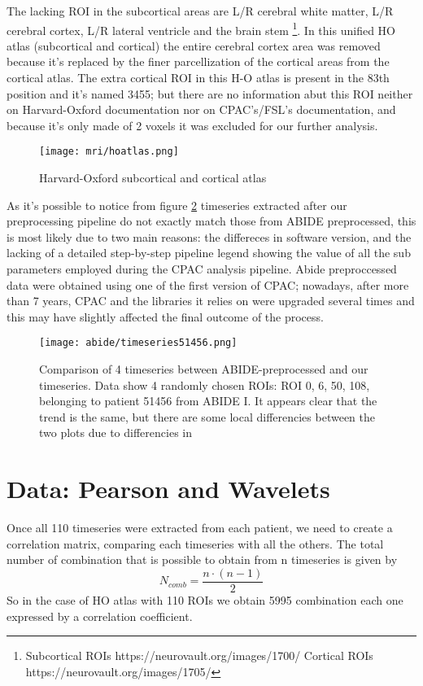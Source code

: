 \documentclass[a4paper,11pt]{article}
\begin{document}
The lacking ROI in the subcortical areas are L/R cerebral white matter, L/R cerebral cortex, L/R lateral ventricle and the brain stem \footnote{Subcortical ROIs https://neurovault.org/images/1700/ \quad Cortical ROIs https://neurovault.org/images/1705/ }.
In this unified HO atlas (subcortical and cortical) the entire cerebral cortex area was removed because it's replaced by the finer parcellization of the cortical areas from the cortical atlas.
The extra cortical ROI in this H-O atlas is present in the 83th position and it's named 3455; but there are no information abut this ROI neither on Harvard-Oxford documentation nor on CPAC's/FSL's documentation, and because it's only made of 2 voxels it was excluded for our further analysis.

\begin{figure}[h]
\centering
\texttt{[image: mri/hoatlas.png]}
\caption{Harvard-Oxford subcortical and cortical atlas}
\label{fig:hoatlas}
\end{figure}


As it's possible to notice from figure \ref{fig:confrontoabidepreproc} timeseries extracted after our preprocessing pipeline do not exactly match those from ABIDE preprocessed, this is most likely due to two main reasons: the differeces in software version, and the lacking of a detailed step-by-step pipeline legend showing the value of all the sub parameters employed during the CPAC analysis pipeline.
Abide preproccessed data were obtained using one of the first version of CPAC; nowadays, after more than 7 years, CPAC and the libraries it relies on were upgraded several times and this may have slightly affected the final outcome of the process.

\begin{figure}[h]
\centering
\texttt{[image: abide/timeseries51456.png]}
\caption{Comparison of 4 timeseries between ABIDE-preprocessed and our timeseries. Data show 4 randomly chosen ROIs: ROI 0, 6, 50, 108, belonging to patient 51456 from ABIDE I.
It appears clear that the trend is the same, but there are some local differencies between the two plots due to differencies in }
\label{fig:confrontoabidepreproc}
\end{figure}













\section{Data: Pearson and Wavelets}
Once all 110 timeseries were extracted from each patient, we need to create a correlation matrix, comparing each timeseries with all the others.
The total number of combination that is possible to obtain from n timeseries is given by
\begin{equation}
N_{comb} = \frac{n\cdot(n-1)}{2}
\end{equation}
So in the case of HO atlas with 110 ROIs we obtain 5995 combination each one expressed by a correlation coefficient.
\end{document}
